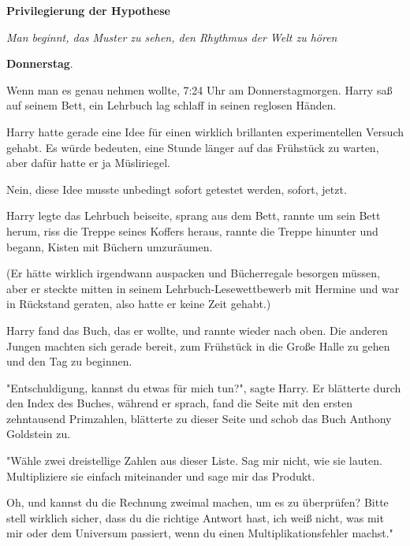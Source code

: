 

\hypertarget{privilegierung-der-hypothese}{%

\textbf{Privilegierung der Hypothese}

\emph{Man beginnt, das Muster zu sehen, den Rhythmus der Welt zu hören}

\textbf{Donnerstag}.

Wenn man es genau nehmen wollte, 7:24 Uhr am Donnerstagmorgen. Harry saß auf seinem Bett, ein Lehrbuch lag schlaff in seinen reglosen Händen.

Harry hatte gerade eine Idee für einen wirklich brillanten experimentellen Versuch gehabt. Es würde bedeuten, eine Stunde länger auf das Frühstück zu warten, aber dafür hatte er ja Müsliriegel.

Nein, diese Idee musste unbedingt sofort getestet werden, sofort, jetzt.

Harry legte das Lehrbuch beiseite, sprang aus dem Bett, rannte um sein Bett herum, riss die Treppe seines Koffers heraus, rannte die Treppe hinunter und begann, Kisten mit Büchern umzuräumen.

(Er hätte wirklich irgendwann auspacken und Bücherregale besorgen müssen, aber er steckte mitten in seinem Lehrbuch-Lesewettbewerb mit Hermine und war in Rückstand geraten, also hatte er keine Zeit gehabt.)

Harry fand das Buch, das er wollte, und rannte wieder nach oben. Die anderen Jungen machten sich gerade bereit, zum Frühstück in die Große Halle zu gehen und den Tag zu beginnen.

"Entschuldigung, kannst du etwas für mich tun?", sagte Harry. Er blätterte durch den Index des Buches, während er sprach, fand die Seite mit den ersten zehntausend Primzahlen, blätterte zu dieser Seite und schob das Buch Anthony Goldstein zu.

"Wähle zwei dreistellige Zahlen aus dieser Liste. Sag mir nicht, wie sie lauten. Multipliziere sie einfach miteinander und sage mir das Produkt.

Oh, und kannst du die Rechnung zweimal machen, um es zu überprüfen? Bitte stell wirklich sicher, dass du die richtige Antwort hast, ich weiß nicht, was mit mir oder dem Universum passiert, wenn du einen Multiplikationsfehler machst."

}
